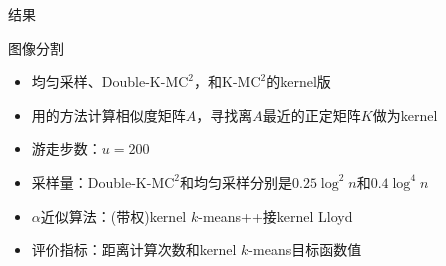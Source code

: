\documentclass[notheorems]{beamer}
\begin{document}
\begin{CJK*}{UTF8}{gbsn}
\begin{frame}{结果}
\end{frame}

\begin{frame}{图像分割}
	\begin{center}
	\end{center}
	\begin{itemize}
		\scriptsize
		\item 均匀采样、Double-K-M$\text{C}^2$，和K-M$\text{C}^2$的kernel版
		\item 用\citet{stella2003multiclass}的方法计算相似度矩阵$A$，寻找离$A$最近的正定矩阵$K$做为kernel
		\item 游走步数：$u=200$
		\item 采样量：Double-K-M$\text{C}^2$和均匀采样分别是$0.25\log^2 n$和$0.4\log^4 n$
		\item $\alpha$近似算法：(带权)kernel $k$-means++接kernel Lloyd
		\item 评价指标：距离计算次数和kernel $k$-means目标函数值
	\end{itemize}
\end{frame}


\end{CJK*}
\end{document}
